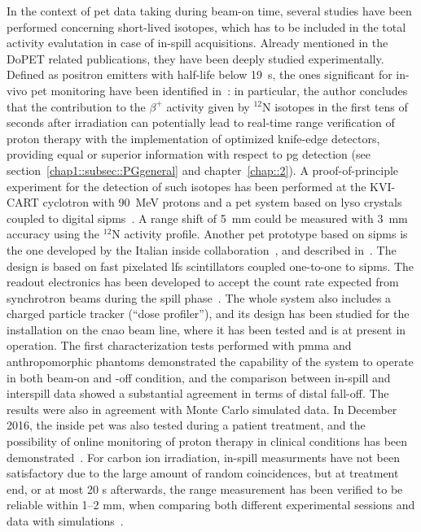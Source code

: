 In the context of \gls{pet} data taking during beam-on time, several studies have been performed concerning short-lived isotopes, which has to be included in the total activity evalutation in case of in-spill acquisitions. Already mentioned in the DoPET related publications, they have been deeply studied experimentally. Defined as positron emitters with half-life below 19~s, the ones significant for in-vivo \gls{pet} monitoring have been identified in~\cite{Dendooven2015}: in particular, the author concludes that the contribution to the $\beta^+$ activity given by $^{12}$N isotopes in the first tens of seconds after irradiation can potentially lead to real-time range verification of proton therapy with the implementation of optimized knife-edge detectors, providing equal or superior information with respect to \gls{pg} detection (see section~\ref{chap1::subsec::PGgeneral} and chapter~\ref{chap::2}). A proof-of-principle experiment for the detection of such isotopes has been performed at the KVI-CART cyclotron with 90~MeV protons and a \gls{pet} system based on \gls{lyso} crystals coupled to  digital \glspl{sipm}~\parencite{Buitenhuis2017}.  A range shift of 5~mm could be measured with 3~mm accuracy using the $^{12}$N activity profile. 
Another \gls{pet} prototype based on \glspl{sipm} is the one developed by the Italian \gls{inside} collaboration~\parencite{Marafini2015}, and described in~\parencite{Bisogni2017}. The design is based on fast pixelated \gls{lfs} scintillators coupled one-to-one to \glspl{sipm}. The readout electronics has been developed to accept the count rate expected from synchrotron beams during the spill phase~\parencite{Rolo2013}. The whole system also includes a charged particle tracker (\enquote{dose profiler}), and its design has been studied for the installation on the \gls{cnao} beam line, where it has been tested and is at present in operation. The first characterization tests performed with \gls{pmma} and anthropomorphic phantoms demonstrated the capability of the system to operate in both beam-on and -off condition, and the comparison between in-spill and interspill data showed a substantial agreement in terms of distal fall-off. The results were also in agreement with Monte Carlo simulated data. In December 2016, the \gls{inside} \gls{pet} was also tested during a patient treatment, and the possibility of online monitoring of proton therapy in clinical conditions has been demonstrated~\parencite{Ferrero2018}. For carbon ion irradiation, in-spill measurments have not been satisfactory due to the large amount of random coincidences, but at treatment end, or at most 20 s afterwards, the range measurement has been verified to be reliable within 1–2 mm, when comparing both different experimental sessions and data with simulations~\parencite{Pennazio2018}. 
